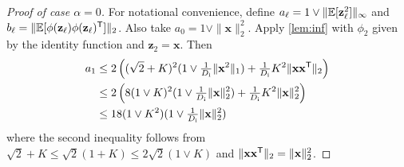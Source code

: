 \documentclass[twoside]{article}
\renewcommand{\ss}[1]{_{\text{#1}}}
\newcommand{\vx}{\mathbf{x}}
\newcommand{\vz}{\mathbf{z}}
\newcommand{\E}{\mathbb{E}}
\newcommand{\T}{\text{\textsf{T}}}
\renewcommand{\ss}[1]{_{\text{#1}}}        %
\DeclarePairedDelimiter\norm{\|}{\|}             %
\theoremstyle{theoremstyle}
\begin{document}
\begin{proof}[Proof of case $\alpha = 0$]
    For notational convenience, define $a_\ell = 1 \lor  \norm{\E[\vz_\ell^2]}_\infty$ and $b_\ell = \norm{\E[\phi(\vz_{\ell})\phi(\vz_{\ell})^\T]}_2$.
    Also take $a_0 = 1\lor \|\vx\|^2_2$. 
    Apply \cref{lem:inf} with $\phi_2$ given by the identity function and $\vz_2 = \vx$.
    Then
    \begin{align}
        a_1 &\leq 2\left((\sqrt{2}+K)^2
                (1 \lor \tfrac1{D\ss{i}}\norm{\vx^2}_1) 
                + \tfrac1{D\ss{i}} K^2 \norm{\vx\vx^\T}_2 \right) \\
            &\le 2\left(8(1 \lor K)^2
                (1 \lor \tfrac1{D\ss{i}}\norm{\vx}_2^2) 
                + \tfrac1{D\ss{i}} K^2 \|\vx\|_2^2 \right) \\
            & \leq 18(1 \lor K^2)(1 \lor \tfrac1{D\ss{i}}\norm{\vx}^2_2) 
    \end{align}
    where the second inequality follows from $\sqrt{2} + K \le \sqrt{2}(1 + K) \le 2\sqrt{2}(1 \lor K)$ and $\norm{\vx\vx^\T}_2 = \norm{\vx}_2^2$.


\end{proof}
\end{document}

